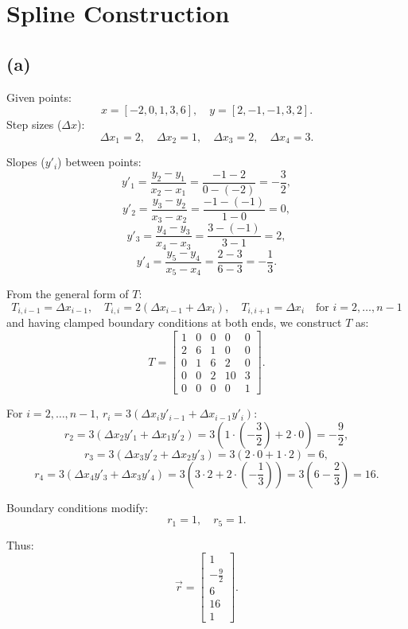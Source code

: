 \documentclass{article}
\begin{document}
\newpage
\section{Spline Construction}
\subsection*{(a)}
Given points:
$$
    x = [-2, 0, 1, 3, 6], \quad y = [2, -1, -1, 3, 2].
$$
Step sizes ($\Delta x$):
$$
    \Delta x_1 = 2, \quad \Delta x_2 = 1, \quad \Delta x_3 = 2, \quad \Delta x_4 = 3.
$$

Slopes ($y'_i$) between points:
$$
    y'_1 = \frac{y_2 - y_1}{x_2 - x_1} = \frac{-1 - 2}{0 - (-2)} = -\frac{3}{2},
$$
$$
    y'_2 = \frac{y_3 - y_2}{x_3 - x_2} = \frac{-1 - (-1)}{1 - 0} = 0,
$$
$$
    y'_3 = \frac{y_4 - y_3}{x_4 - x_3} = \frac{3 - (-1)}{3 - 1} = 2,
$$
$$
    y'_4 = \frac{y_5 - y_4}{x_5 - x_4} = \frac{2 - 3}{6 - 3} = -\frac{1}{3}.
$$

From the general form of $T$:
$$
    T_{i, i-1} = \Delta x_{i-1}, \quad T_{i, i} = 2(\Delta x_{i-1} + \Delta x_i), \quad T_{i, i+1} = \Delta x_i \quad \text{for }i=2,\dots,n-1
$$
and having clamped boundary conditions at both
ends, we construct $T$ as:
$$
    T =
    \begin{bmatrix}
        1 & 0 & 0 & 0  & 0 \\
        2 & 6 & 1 & 0  & 0 \\
        0 & 1 & 6 & 2  & 0 \\
        0 & 0 & 2 & 10 & 3 \\
        0 & 0 & 0 & 0  & 1
    \end{bmatrix}.
$$

For $i = 2, \dots, n-1$, $r_i = 3(\Delta x_i y'_{i-1} + \Delta x_{i-1} y'_i)$:
$$
    r_2 = 3(\Delta x_2 y'_1 + \Delta x_1 y'_2) = 3(1 \cdot (-\frac{3}{2}) + 2 \cdot 0) = -\frac{9}{2},
$$
$$
    r_3 = 3(\Delta x_3 y'_2 + \Delta x_2 y'_3) = 3(2 \cdot 0 + 1 \cdot 2) = 6,
$$
$$
    r_4 = 3(\Delta x_4 y'_3 + \Delta x_3 y'_4) = 3(3 \cdot 2 + 2 \cdot (-\frac{1}{3})) = 3(6 - \frac{2}{3}) = 16.
$$

Boundary conditions modify:
$$
    r_1 = 1, \quad r_5 = 1.
$$

Thus:
$$
    \vec{r} = \begin{bmatrix}
        1            \\
        -\frac{9}{2} \\
        6            \\
        16 \\
        1
    \end{bmatrix}.
$$
\end{document}
